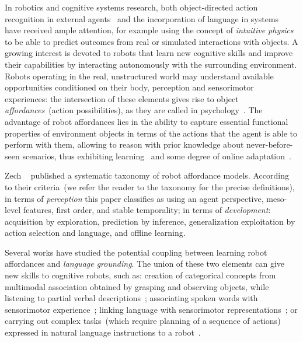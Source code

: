 In robotics and cognitive systems research, both object-directed action recognition in external agents~\cite{koppula:2013:ijrr} and the incorporation of language in \hr{} systems~\cite{harnad:1990,matuszek:2014:aaai} have received ample attention, for example using the concept of \emph{intuitive physics}~\cite{lake:2017:bbs,gao:2018:acl} to be able to predict outcomes from real or simulated interactions with objects.
A growing interest is devoted to robots that learn new cognitive skills and improve their capabilities by interacting autonomously with the surrounding environment.
Robots operating in the real, unstructured world may understand available opportunities conditioned on their body, perception and sensorimotor experiences: the intersection of these elements gives rise to object \emph{affordances}~(action possibilities), as they are called in psychology~\cite{gibson:2014}.
The advantage of robot affordances lies in the ability to capture essential functional properties of environment objects in terms of the actions that the agent is able to perform with them, allowing to reason with prior knowledge about never-before-seen scenarios, thus exhibiting learning~\cite{montesano:2008,jamone:2016:tcds} and some degree of online adaptation~\cite{maestre:2017:icdl}.

Zech \etal{}~\cite{zech:2017:ab} published a systematic taxonomy of robot affordance models.
According to their criteria~(we refer the reader to the taxonomy for the precise definitions), in terms of \emph{perception} this paper classifies as using
an agent perspective, meso-level features, first order, and stable temporality;
in terms of \emph{development}: acquisition by exploration, prediction by inference, generalization exploitation by action selection and language, and offline learning.

Several works have studied the potential coupling between learning robot affordances and \emph{language grounding}.
The union of these two elements can give new skills to cognitive robots, such as:
creation of categorical concepts from multimodal association obtained by grasping and observing objects, while listening to partial verbal descriptions~\cite{nakamura:2009:iros,araki:2012:iros};
associating spoken words with sensorimotor experience~\cite{salvi:2012:smcb,morse:2016:cogsci};
linking language with sensorimotor representations~\cite{stramandinoli:2016:icdl}; or
carrying out complex tasks~(which require planning of a sequence of actions) expressed in natural language instructions to a robot~\cite{antunes:2016:icra}.

